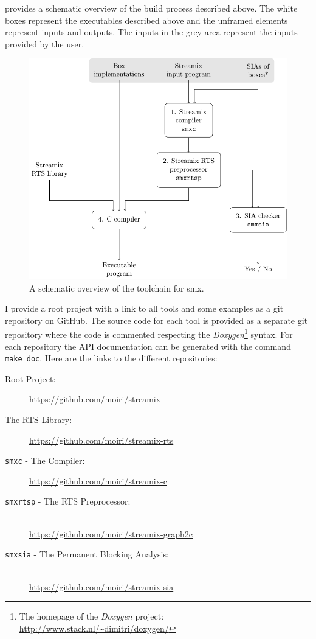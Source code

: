 \Fig{\ref{fig_toolchain}} provides a schematic overview of the build process described above.
The white boxes represent the executables described above and the unframed elements represent inputs and outputs.
The inputs in the grey area represent the inputs provided by the user.
\begin{figure}[bht]
    \TopFigSpace
    \centering
    \includegraphics[width=12cm]{fig/toolchain.pdf}
    \CaptionFigSpace
    \caption{A schematic overview of the toolchain for \gls*{smx}.}
    \label{fig_toolchain}
    \BotFigSpace
\end{figure}

I provide a root project with a link to all tools and some examples as a git repository on GitHub.
The source code for each tool is provided as a separate git repository where the code is commented respecting the \emph{Doxygen}\footnote{The homepage of the \emph{Doxygen} project: \url{http://www.stack.nl/~dimitri/doxygen/}} syntax.
For each repository the API documentation can be generated with the command \texttt{make doc}.
Here are the links to the different repositories:
\begin{description}
    \item[Root Project:] \url{https://github.com/moiri/streamix}
    \item[The RTS Library:] \url{https://github.com/moiri/streamix-rts}
    \item[\texttt{smxc} - The Compiler:] \url{https://github.com/moiri/streamix-c}
    \item[\texttt{smxrtsp} - The RTS Preprocessor:] \hfill \\
        \url{https://github.com/moiri/streamix-graph2c}
    \item[\texttt{smxsia} - The Permanent Blocking Analysis:] \hfill \\
        \url{https://github.com/moiri/streamix-sia}
\end{description}


